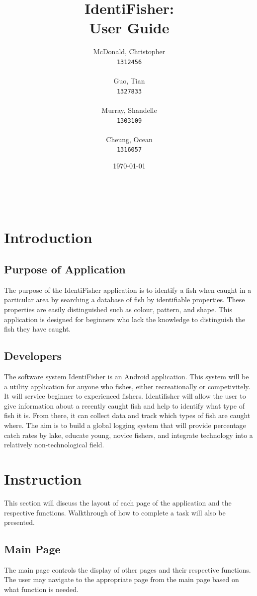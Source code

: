 \documentclass{article}
\title{IdentiFisher: \\ User Guide \\}
\author{
\Large McDonald, Christopher\\
\texttt{1312456} \\ \\
\Large Guo, Tian\\
\texttt{1327833} \\ \\
\Large Murray, Shandelle\\
\texttt{1303109} \\ \\
\Large Cheung, Ocean\\
\texttt{1316057} \\
}
\date{\today}
\begin{document}
\maketitle

\newpage
\tableofcontents
\vfill
\noindent \\


\pagebreak
\section{Introduction}

\subsection{Purpose of Application}
The purpose of the IdentiFisher application is to identify a fish when caught in a particular area
by searching a database of fish by identifiable properties. These properties are easily distinguished
such as colour, pattern, and shape. This application is designed for beginners who lack the knowledge
to distinguish the fish they have caught.

\subsection{Developers}
The software system IdentiFisher is an Android application.
This system will be a utility application for anyone who fishes, either recreationally or
competivitely. It will service beginner to experienced fishers. Identifisher will allow
the user to give information about a recently caught fish and help to identify what type
of fish it is. From there, it can collect data and track which types of fish are caught where. The aim is to
build a global logging system that will provide percentage catch rates by lake,
educate young, novice fishers, and integrate technology into a relatively non-technological field.


\section{Instruction}
This section will discuss the layout of each page of the application and the respective functions.
Walkthrough of how to complete a task will also be presented.

\subsection{Main Page}
The main page controls the display of other pages and their respective functions. The user may navigate to the
appropriate page from the main page based on what function is needed. \\
\end{document}
